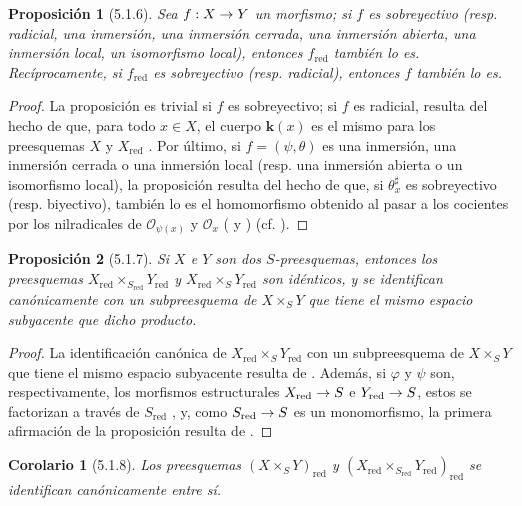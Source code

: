 \documentclass[oneside]{amsart}
\theoremstyle{ega-env-style}
\theoremstyle{ega-thm-env-style}
\newtheorem*{proposition}{Proposición}
\newtheorem*{corollary}{Corolario}
\theoremstyle{ega-defn-env-style}
\renewcommand{\to}{\mathchoice{\longrightarrow}{\rightarrow}{\rightarrow}{\rightarrow}}
\let\EGAOriginalLabel\label
\renewcommand{\label}[1]{\phantomsection\EGAOriginalLabel{#1}}
\begin{document}
\begin{proposition}[5.1.6]
\label{I.5.1.6}
Sea $f:X\to Y$ un morfismo;
si $f$ es sobreyectivo (\textup{resp.} radicial, una inmersión, una inmersión cerrada, una inmersión abierta, una inmersión local, un isomorfismo local), entonces $f_{\mathrm{red}}$ también lo es.
Recíprocamente, si $f_{\mathrm{red}}$ es sobreyectivo (\textup{resp.} radicial), entonces $f$ también lo es.
\end{proposition}

\begin{proof}
La proposición es trivial si $f$ es sobreyectivo;
si $f$ es radicial, resulta del hecho de que, para todo $x\in X$, el cuerpo $\boldsymbol{k}(x)$ es el mismo para los preesquemas $X$ y $X_{\mathrm{red}}$ .
Por último, si $f=(\psi,\theta)$ es una inmersión, una inmersión cerrada o una inmersión local (resp. una inmersión abierta o un isomorfismo local), la proposición resulta del hecho de que, si $\theta_x^\sharp$ es sobreyectivo (resp. biyectivo), también lo es el homomorfismo obtenido al pasar a los cocientes por los nilradicales de $\mathscr{O}_{\psi(x)}$ y $\mathscr{O}_x$ ( y ) (cf. ).
\end{proof}

\begin{proposition}[5.1.7]
\label{I.5.1.7}
Si $X$ e $Y$ son dos $S$-preesquemas, entonces los preesquemas $X_{\mathrm{red}}\times_{S_{\mathrm{red}}}Y_{\mathrm{red}}$ y $X_{\mathrm{red}}\times_S Y_{\mathrm{red}}$ son idénticos, y se identifican canónicamente con un subpreesquema de $X\times_S Y$ que tiene el mismo espacio subyacente que dicho producto.
\end{proposition}

\begin{proof}
La identificación canónica de $X_{\mathrm{red}}\times_S Y_{\mathrm{red}}$ con un subpreesquema de $X\times_S Y$ que tiene el mismo espacio subyacente resulta de .
Además, si $\varphi$ y $\psi$ son, respectivamente, los morfismos estructurales $X_{\mathrm{red}}\to S$ e $Y_{\mathrm{red}}\to S$, estos se factorizan a través de $S_{\mathrm{red}}$ , y, como $S_{\mathrm{red}}\to S$ es un monomorfismo, la primera afirmación de la proposición resulta de .
\end{proof}

\begin{corollary}[5.1.8]
\label{I.5.1.8}
Los preesquemas $(X\times_S Y)_{\mathrm{red}}$ y $(X_{\mathrm{red}}\times_{S_{\mathrm{red}}}Y_{\mathrm{red}})_{\mathrm{red}}$ se identifican canónicamente entre sí.
\end{corollary}
\end{document}
